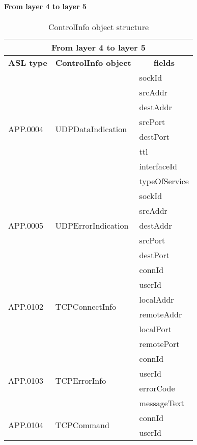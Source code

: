 \newpage
\paragraph{From layer 4 to layer 5}
\begin{table}
\centering
\ttfamily
\footnotesize
\caption{ControlInfo object structure}
\label{tab:from4-to5}
\begin{tabular}{|l|l|l|}
\hline
\multicolumn{3}{|c|}{\normalfont\textbf{From layer 4 to layer 5}}	\\
\hline
\multicolumn{1}{|c|}{\normalfont\textbf{ASL type}}	&\multicolumn{1}{c|}{\normalfont\textbf{ControlInfo object}}		&\multicolumn{1}{c|}{\normalfont\textbf{fields}}\\
\hline
\multirow{8}{*}{APP.0004}	&\multirow{8}{*}{UDPDataIndication}		&sockId		\\
					&								&srcAddr		\\
					&								&destAddr		\\
					&								&srcPort		\\
					&								&destPort		\\
					&								&ttl			\\
					&								&interfaceId	\\
					&								&typeOfService	\\
\hline
\multirow{5}{*}{APP.0005}	&\multirow{5}{*}{UDPErrorIndication}		&sockId		\\
					&								&srcAddr		\\
					&								&destAddr		\\
					&								&srcPort		\\
					&								&destPort		\\
\hline
\multirow{6}{*}{APP.0102}	&\multirow{6}{*}{TCPConnectInfo}		&connId		\\
					&								&userId		\\
					&								&localAddr	\\
					&								&remoteAddr	\\
					&								&localPort		\\
					&								&remotePort	\\
\hline
\multirow{4}{*}{APP.0103}	&\multirow{4}{*}{TCPErrorInfo}			&connId		\\
					&								&userId		\\
					&								&errorCode	\\
					&								&messageText	\\
\hline
\multirow{2}{*}{APP.0104}	&\multirow{2}{*}{TCPCommand}		&connId		\\
					&								&userId		\\
\hline
\end{tabular}
\end{table}



